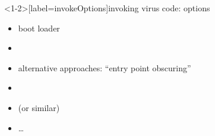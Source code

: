 
\begin{frame}<1-2>[label=invokeOptions]{invoking virus code: options}
    \begin{itemize}
    \item boot loader
    \item {} 
    \item alternative approaches: ``entry point obscuring''
    \item {}
    \item {} (or similar)
    \item \ldots
    \end{itemize}
\end{frame}
